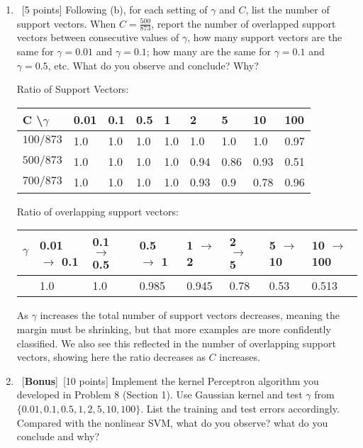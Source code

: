 \documentclass[12pt, fullpage,letterpaper]{article}
\begin{document}
\begin{enumerate}
\begin{enumerate}
	\item~[5 points] Following (b), for each setting of $\gamma$ and $C$, list the number of support vectors. When $C = \frac{500}{873}$, report the number of overlapped support vectors between consecutive values of $\gamma$, \ie how many support vectors are the same for $\gamma= 0.01$ and $\gamma = 0.1$; how many are the same for  $\gamma = 0.1$ and $\gamma = 0.5$, etc. What do you observe and conclude? Why?
	
	Ratio of Support Vectors:
	\begin{table}[h]
		\begin{tabular}{l||llllllll}
			C \textbackslash $\gamma$ & 0.01 & 0.1 & 0.5 & 1 & 2 & 5 & 10 & 100 \\
			\hline\hline
			$100/873$ & 1.0 & 1.0 & 1.0 & 1.0 & 1.0 & 1.0 & 1.0 & 0.97 \\
			$500/873$ & 1.0 & 1.0 & 1.0 & 1.0 & 0.94 & 0.86 & 0.93 & 0.51 \\
			$700/873$ & 1.0 & 1.0 & 1.0 & 1.0 & 0.93 & 0.9 & 0.78 & 0.96 \\
		\end{tabular}
	\end{table}

	\pagebreak
	
	Ratio of overlapping support vectors:
	\begin{table}[h]
		\begin{tabular}{l||lllllll}
			$\gamma$ & 0.01 $\rightarrow$ 0.1 & 0.1 $\rightarrow$ 0.5 & 0.5 $\rightarrow$ 1 & 1 $\rightarrow$ 2 & 2 $\rightarrow$ 5 & 5 $\rightarrow$ 10 & 10 $\rightarrow$ 100 \\
			\hline\hline
			 & 1.0 & 1.0 & 0.985 & 0.945 & 0.78 & 0.53 & 0.513 \\
		\end{tabular}
	\end{table}


	As $\gamma$ increases the total number of support vectors decreases, meaning the margin must be shrinking, but that more examples are more confidently classified. We also see this reflected in the number of overlapping support vectors, showing here the ratio decreases as $C$ increases.
	
	\item~[\textbf{Bonus}]~[10 points] Implement the kernel Perceptron algorithm you developed in Problem 8 (Section 1). Use Gaussian kernel and test $\gamma$ from $\{0.01, 0.1, 0.5, 1, 2, 5, 10, 100\}$. List the training and test errors accordingly. Compared with the nonlinear SVM, what do you observe? what do you conclude and why?
	
\end{enumerate} 

\end{enumerate}
\end{document}
